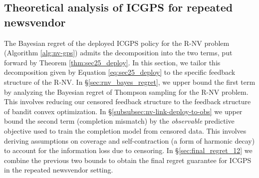 \documentclass[11pt]{article}
\begin{document}
\subsection{Theoretical analysis of ICGPS for repeated newsvendor}
\label{subsec:nv-theory}

The Bayesian regret of the deployed ICGPS policy for the R-NV problem (Algorithm \ref{alg:nv-gps}) admits the decomposition into the two terms, put forward by Theorem \ref{thm:sec25_deploy}. In this section, we tailor this decomposition given by Equation \eqref{eq:sec25_deploy} to the specific feedback structure of the R-NV. In \S\ref{sec:rnv_bayes_regret}, we upper bound the first term by analyzing the Bayesian regret of Thompson sampling for the R-NV problem. This involves reducing our censored feedback structure to the feedback structure of bandit convex optimization. In \S\ref{subsubsec:nv-link-deploy-to-obs} we upper bound the second term (completion mismatch) by the \emph{observable} predictive objective used to train the completion model from censored data. This involves deriving assumptions on coverage and self-contraction (a form of harmonic decay) to account for the information loss due to censoring. In \S\ref{sec:final_regret_12} we combine the previous two bounds to obtain the final regret guarantee for ICGPS in the repeated newsvendor setting.
\end{document}
